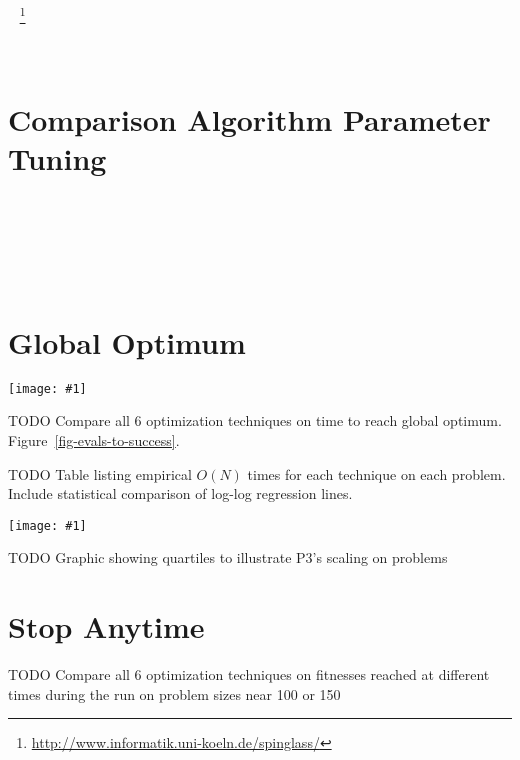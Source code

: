\documentclass[twoside]{article}
\newcommand{\includegraphicsfit}[1]
{\texttt{[image: \#1]}}
\begin{document}
~\cite{wright:2000:solvingnk}

~\cite{saul:1994:spinglass}
\footnote{\url{http://www.informatik.uni-koeln.de/spinglass/}}

~\cite{goldman:2014:p3} %

\section{Comparison Algorithm Parameter Tuning}
~\cite{goldman:2012:ltga} %

~\cite{goldman:2014:p3}

~\cite{jovanovic:1997:ruleofthree}

\section{Global Optimum}

\begin{figure*}
  \centering
  \includegraphicsfit{evals-to-success}
  \caption{Comparison of the median number of evaluations to reach the global optimum for
           the six different optimization methods with respect
           to problem size.  If the median run did not reach the global optimum no data element
           is shown.  Results given on a log-log scale.}
  \label{fig-evals-to-success}
\end{figure*}

TODO Compare all 6 optimization techniques on time to reach global optimum.  Figure~\ref{fig-evals-to-success}.

TODO Table listing empirical $O(N)$ times for each technique on each problem. Include
statistical comparison of log-log regression lines.

\begin{figure*}
  \centering
  \includegraphicsfit{evals-to-success-range}
  \caption{Comparison of the upper and lower quartiles of evaluations required to reach the global optimum for
           three different optimization methods with respect
           to problem size.}
  \label{fig-evals-to-success-range}
\end{figure*}

TODO Graphic showing quartiles to illustrate P3's scaling on problems

\section{Stop Anytime}
TODO Compare all 6 optimization techniques on fitnesses reached at different times
during the run on problem sizes near 100 or 150
\end{document}
